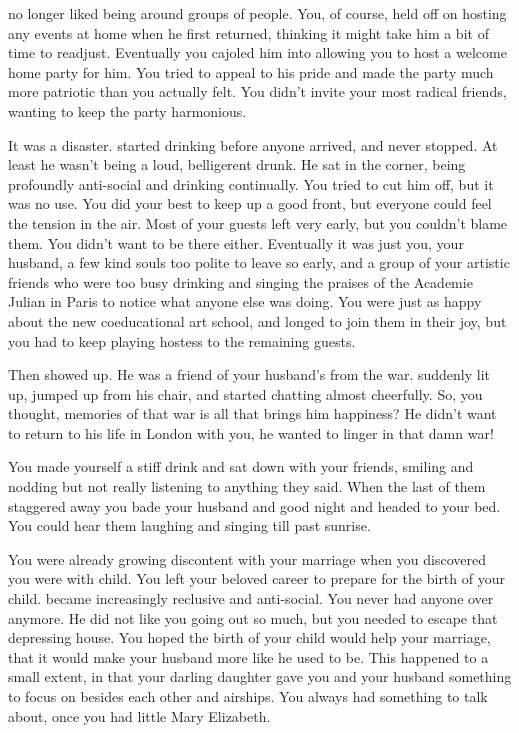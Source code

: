 \documentclass[char]{airship}
\begin{document}
\cCaptain{} no longer liked being around groups of people. You, of
course, held off on hosting any events at home when he first returned,
thinking it might take him a bit of time to readjust. Eventually you
cajoled him into allowing you to host a welcome home party for
him. You tried to appeal to his pride and made the party much more
patriotic than you actually felt. You didn't invite your most radical
friends, wanting to keep the party harmonious.

It was a disaster. \cCaptain{} started drinking before anyone arrived,
and never stopped. At least he wasn't being a loud, belligerent
drunk. He sat in the corner, being profoundly anti-social and drinking
continually. You tried to cut him off, but it was no use. You did your
best to keep up a good front, but everyone could feel the tension in
the air. Most of your guests left very early, but you couldn't blame
them. You didn't want to be there either. Eventually it was just you,
your husband, a few kind souls too polite to leave so early, and a
group of your artistic friends who were too busy drinking and singing
the praises of the Academie Julian in Paris to notice what anyone else
was doing. You were just as happy about the new coeducational art
school, and longed to join them in their joy, but you had to keep
playing hostess to the remaining guests.

Then \cBoddy{\intro} showed up. He was a friend of your husband's from
the war. \cCaptain{} suddenly lit up, jumped up from his chair,
and started chatting almost cheerfully. So, you thought, memories of that
war is all that brings him happiness? He didn't want to return to his
life in London with you, he wanted to linger in that damn war!

You made yourself a stiff drink and sat down with your friends,
smiling and nodding but not really listening to anything they
said. When the last of them staggered away you bade your husband and
\cBoddy{} good night and headed to your bed. You could hear them
laughing and singing till past sunrise.

You were already growing discontent with your marriage when you
discovered you were with child. You left your beloved career to
prepare for the birth of your child. \cCaptain{} became increasingly
reclusive and anti-social. You never had anyone over anymore. He did
not like you going out so much, but you needed to escape that
depressing house. You hoped the birth of your child would help your
marriage, that it would make your husband more like he used to
be. This happened to a small extent, in that your darling daughter
gave you and your husband something to focus on besides each other and
airships. You always had something to talk about, once you had little
Mary Elizabeth.
\end{document}
